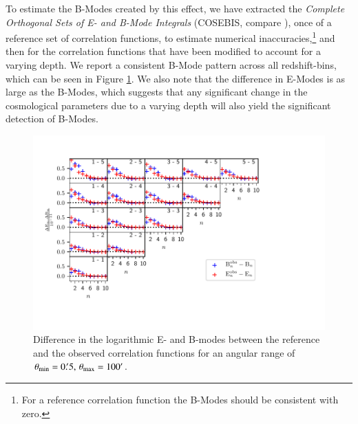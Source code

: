 To estimate the B-Modes created by this effect, we have extracted the \emph{Complete Orthogonal Sets of E- and B-Mode Integrals} (COSEBIS, compare \citet{2010A&A...520A.116S}), once of a reference set of correlation functions, to estimate numerical inaccuracies,\footnote{For a reference correlation function the B-Modes should be consistent with zero.} and then for the correlation functions that have been modified to account for a varying depth. We report a consistent B-Mode pattern across all redshift-bins, which can be seen in Figure \ref{fig:bmodes_cosebi}. We also note that the difference in E-Modes is as large as the B-Modes, which suggests that any significant change in the cosmological parameters due to a varying depth will also yield the significant detection of B-Modes.

\begin{figure}
\centering
\includegraphics[width = \textwidth, trim = {0 1.5cm 2.5cm 0}, clip]{images/eandbmodes0p5t100.pdf}
\caption{Difference in the logarithmic E- and B-modes between the reference and the observed correlation functions for an angular range of $\theta_{\mathrm{min}}=0.\!^\prime 5,\,\theta_{\mathrm{max}}=100^\prime$.}
\label{fig:bmodes_cosebi}
\end{figure}
